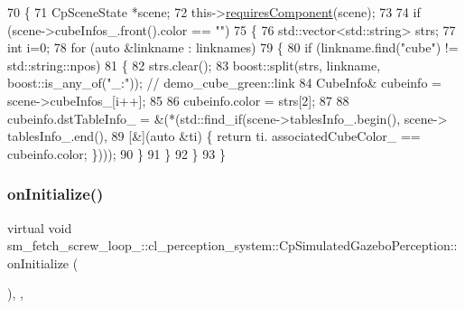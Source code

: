 \begin{DoxyCode}
70             \{
71                 CpSceneState *scene;
72                 this->\hyperlink{classsmacc_1_1ISmaccComponent_aa06d58b1dcec3c513ca2edddfd3847ec}{requiresComponent}(scene);
73 
74                 \textcolor{keywordflow}{if} (scene->cubeInfos\_.front().color == \textcolor{stringliteral}{""})
75                 \{
76                     std::vector<std::string> strs;
77                     \textcolor{keywordtype}{int} i=0;
78                     \textcolor{keywordflow}{for} (\textcolor{keyword}{auto} &linkname : linknames)
79                     \{
80                         \textcolor{keywordflow}{if} (linkname.find(\textcolor{stringliteral}{"cube"}) != std::string::npos)
81                         \{
82                             strs.clear();
83                             boost::split(strs, linkname, boost::is\_any\_of(\textcolor{stringliteral}{"\_:"})); \textcolor{comment}{// demo\_cube\_green::link}
84                             CubeInfo& cubeinfo = scene->cubeInfos\_[i++];
85 
86                             cubeinfo.color = strs[2];
87 
88                             cubeinfo.dstTableInfo\_ = &(*(std::find\_if(scene->tablesInfo\_.begin(), scene->
      tablesInfo\_.end(),
89                                                                       [&](\textcolor{keyword}{auto} &ti) \{ \textcolor{keywordflow}{return} ti.
      associatedCubeColor\_ == cubeinfo.color; \})));
90                         \}
91                     \}
92                 \}
93             \}
\end{DoxyCode}
\mbox{\label{classsm__fetch__screw__loop__1_1_1cl__perception__system_1_1CpSimulatedGazeboPerception_a2cde9f6f8ba4b5b660f7ac8cf86f9e29}} 
\subsubsection{\texorpdfstring{on\+Initialize()}{onInitialize()}}
{\footnotesize\ttfamily virtual void sm\+\_\+fetch\+\_\+screw\+\_\+loop\+\_\+::cl\+\_\+perception\+\_\+system\+::\+Cp\+Simulated\+Gazebo\+Perception\+::on\+Initialize (\begin{DoxyParamCaption}{ }\end{DoxyParamCaption})\hspace{0.3cm}{\ttfamily [inline]}, {\ttfamily [override]}, {\ttfamily [virtual]}}



